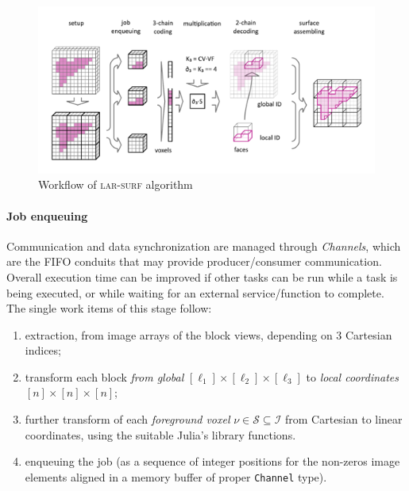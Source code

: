 \begin{figure}[tbp]
\includegraphics[width=\textwidth]{figs/schema_horizontal.pdf} 
\caption{Workflow of \textsc{lar-surf} algorithm}
\label{fig:schema}
\end{figure}



\paragraph{Job enqueuing}
\label{sec:job-enq}
Communication and data synchronization are managed through \emph{Channels}, which are the FIFO conduits that may provide producer/consumer communication. Overall execution time can be improved if other tasks can be run while a task is being executed, or while waiting for an external service/function to complete. The single work items of this stage follow:
\begin{enumerate}

\item extraction, from image arrays of the block views, depending on 3 Cartesian indices;

\item transform  each block \emph{from global} $[\ell_1]\times[\ell_2]\times[\ell_3]$ to \emph{local coordinates} $[n]\times[n]\times[n]$;

\item further transform of each \emph{foreground voxel} $\nu\in\mathcal{S}\subseteq\mathcal{I}$ from Cartesian to linear coordinates, using the suitable Julia's library functions.

\item enqueuing the job (as a sequence of integer positions for the non-zeros image elements aligned in a memory buffer of proper \texttt{Channel} type).
\end{enumerate}

